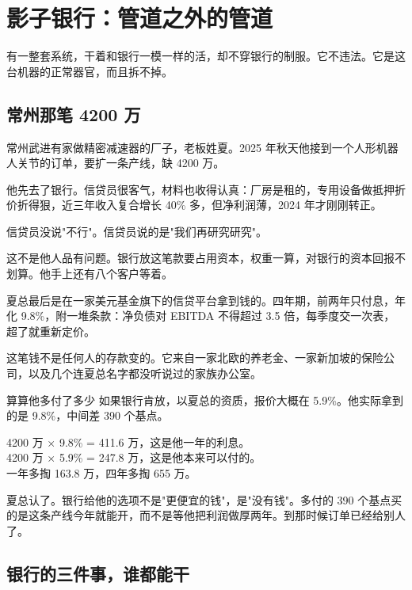 \chapter{影子银行：管道之外的管道}

\begin{ledetext}
有一整套系统，干着和银行一模一样的活，却不穿银行的制服。它不违法。它是这台机器的正常器官，而且拆不掉。
\end{ledetext}

\section{常州那笔 4200 万}

常州武进有家做精密减速器的厂子，老板姓夏。2025 年秋天他接到一个人形机器人关节的订单，要扩一条产线，缺 4200 万。

他先去了银行。信贷员很客气，材料也收得认真：厂房是租的，专用设备做抵押折价折得狠，近三年收入复合增长 40\% 多，但净利润薄，2024 年才刚刚转正。

信贷员没说"不行"。信贷员说的是"我们再研究研究"。

这不是他人品有问题。银行放这笔款要占用资本，权重一算，对银行的资本回报不划算。他手上还有八个客户等着。

夏总最后是在一家美元基金旗下的信贷平台拿到钱的。四年期，前两年只付息，年化 9.8\%，附一堆条款：净负债对 EBITDA 不得超过 3.5 倍，每季度交一次表，超了就重新定价。

这笔钱不是任何人的存款变的。它来自一家北欧的养老金、一家新加坡的保险公司，以及几个连夏总名字都没听说过的家族办公室。

\begin{egbox}{算算他多付了多少}
如果银行肯放，以夏总的资质，报价大概在 5.9\%。他实际拿到的是 9.8\%，中间差 390 个基点。

4200 万 × 9.8\% = 411.6 万，这是他一年的利息。\\ 4200 万 × 5.9\% = 247.8 万，这是他本来可以付的。\\ 一年多掏 163.8 万，四年多掏 655 万。

夏总认了。银行给他的选项不是"更便宜的钱"，是"没有钱"。多付的 390 个基点买的是这条产线今年就能开，而不是等他把利润做厚两年。到那时候订单已经给别人了。

\end{egbox}

\section{银行的三件事，谁都能干}

